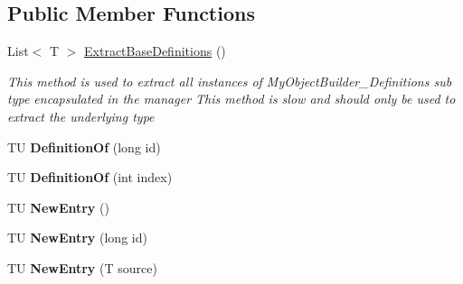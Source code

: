 \subsection*{Public Member Functions}
\begin{DoxyCompactItemize}
\item 
List$<$ T $>$ \hyperlink{class_s_e_mod_a_p_i_1_1_a_p_i_1_1_definitions_1_1_over_layer_definitions_manager_a4059ec55638845a314561d9390c248e7}{Extract\+Base\+Definitions} ()
\begin{DoxyCompactList}\small\item\em This method is used to extract all instances of My\+Object\+Builder\+\_\+\+Definitions sub type encapsulated in the manager This method is slow and should only be used to extract the underlying type \end{DoxyCompactList}\item 
\hypertarget{class_s_e_mod_a_p_i_1_1_a_p_i_1_1_definitions_1_1_over_layer_definitions_manager_ad586ed13101df9a1b012aa2f0de8c4f9}{}T\+U {\bfseries Definition\+Of} (long id)\label{class_s_e_mod_a_p_i_1_1_a_p_i_1_1_definitions_1_1_over_layer_definitions_manager_ad586ed13101df9a1b012aa2f0de8c4f9}

\item 
\hypertarget{class_s_e_mod_a_p_i_1_1_a_p_i_1_1_definitions_1_1_over_layer_definitions_manager_a67507f4918519451fe7ab8a7bd1b31a5}{}T\+U {\bfseries Definition\+Of} (int index)\label{class_s_e_mod_a_p_i_1_1_a_p_i_1_1_definitions_1_1_over_layer_definitions_manager_a67507f4918519451fe7ab8a7bd1b31a5}

\item 
\hypertarget{class_s_e_mod_a_p_i_1_1_a_p_i_1_1_definitions_1_1_over_layer_definitions_manager_abaea5e2fe3e65fad3d5e039df7b34d16}{}T\+U {\bfseries New\+Entry} ()\label{class_s_e_mod_a_p_i_1_1_a_p_i_1_1_definitions_1_1_over_layer_definitions_manager_abaea5e2fe3e65fad3d5e039df7b34d16}

\item 
\hypertarget{class_s_e_mod_a_p_i_1_1_a_p_i_1_1_definitions_1_1_over_layer_definitions_manager_a28ea25a62b0cb714d802b2b40238dfa0}{}T\+U {\bfseries New\+Entry} (long id)\label{class_s_e_mod_a_p_i_1_1_a_p_i_1_1_definitions_1_1_over_layer_definitions_manager_a28ea25a62b0cb714d802b2b40238dfa0}

\item 
\hypertarget{class_s_e_mod_a_p_i_1_1_a_p_i_1_1_definitions_1_1_over_layer_definitions_manager_a613d8157f2a9a30851aeea9ba950402f}{}T\+U {\bfseries New\+Entry} (T source)\label{class_s_e_mod_a_p_i_1_1_a_p_i_1_1_definitions_1_1_over_layer_definitions_manager_a613d8157f2a9a30851aeea9ba950402f}


\end{DoxyCompactItemize}
